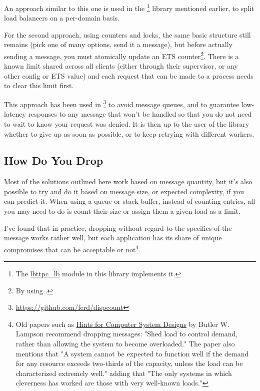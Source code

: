 \documentclass[11pt, oneside]{book}   	%
\begin{document}
An approach similar to this one is used in the \footnote{The \href{https://github.com/ferd/lhttpc/blob/master/src/lhttpc\_lb.erl}{lhttpc\_lb} module in this library implements it.} library mentioned earlier, to split load balancers on a per-domain basis.

For the second approach, using counters and locks, the same basic structure still remains (pick one of many options, send it a message), but before actually sending a message, you must atomically update an ETS counter\footnote{By using .}. There is a known limit shared across all clients (either through their supervisor, or any other config or ETS value) and each request that can be made to a process needs to clear this limit first.

This approach has been used in \footnote{\href{https://github.com/ferd/dispcount}{https://github.com/ferd/dispcount}} to avoid message queues, and to guarantee low-latency responses to any message that won't be handled so that you do not need to wait to know your request was denied. It is then up to the user of the library whether to give up as soon as possible, or to keep retrying with different workers.

\subsection{How Do You Drop}

Most of the solutions outlined here work based on message quantity, but it's also possible to try and do it based on message size, or expected complexity, if you can predict it. When using a queue or stack buffer, instead of counting entries, all you may need to do is count their size or assign them a given load as a limit.

I've found that in practice, dropping without regard to the specifics of the message works rather well, but each application has its share of unique compromises that can be acceptable or not\footnote{Old papers such as \href{http://research.microsoft.com/en-us/um/people/blampson/33-hints/webpage.html}{Hints for Computer System Designs} by Butler W. Lampson recommend dropping messages: "Shed load to control demand, rather than allowing the system to become overloaded." The paper also mentions that  "A system cannot be expected to function well if the demand for any resource exceeds two-thirds of the capacity, unless the load can be characterized extremely well." adding that "The only systems in which cleverness has worked are those with very well-known loads."}.
\end{document}
